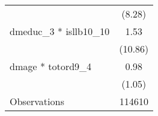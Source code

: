 {\begin{tabular}{l*{1}{c}}
                                                  &      (8.28)\\
dmeduc\_3 * isllb10\_10                             &        1.53\\
                                                  &     (10.86)\\
dmage * totord9\_4                                 &        0.98\\
                                                  &      (1.05)\\
\hline
Observations                                      &      114610\\
\hline\hline
\end{tabular}
}
